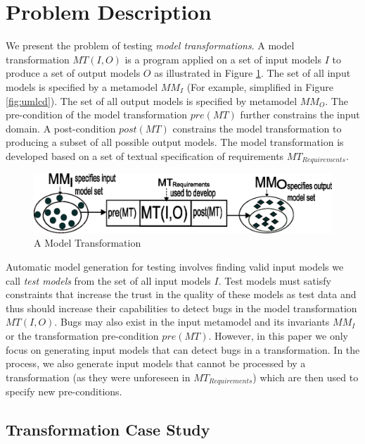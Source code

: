 \section{Problem Description}
\label{sec:ProblemDescription}

We present the problem of  testing \emph{model transformations}. A model transformation $MT(I,O)$ is a program applied on a set of input models $I$ to produce a set of output models $O$ as illustrated in Figure \ref{fig:exampleAndMT}. The set of all input models is specified by a metamodel $MM_{I}$ (For example, simplified {\UMLCD} in Figure \ref{fig:umlcd}). The set of all output models is specified by metamodel $MM_{O}$. The pre-condition of the model transformation $pre(MT)$ further constrains the input domain. A post-condition $post(MT)$ constrains the model transformation to producing a subset of all possible output models. The model transformation is developed based on a set of textual specification of requirements $MT_{Requirements}$.

\begin{figure} [!t]
\begin{center}

\includegraphics[width=3.5 in]{./figures/modelTransformation.eps}
\end{center}

\caption{A Model Transformation}
\label{fig:exampleAndMT}

\end{figure}

Automatic model generation for testing involves finding valid input models we call \emph{test models} from the set of all input models $I$. Test models must  satisfy constraints that increase the trust in the quality of these models as test data and thus should increase their capabilities to detect bugs in the model transformation $MT(I,O)$. Bugs may also exist in the input metamodel and its invariants $MM_{I}$ or the transformation pre-condition $pre(MT)$. However, in this paper we only focus on generating input models that can detect bugs in a transformation. In the process, we also generate input models that cannot be processed by a transformation (as they were unforeseen in $MT_{Requirements}$) which are then used to specify new pre-conditions.

\subsection{Transformation Case Study}

